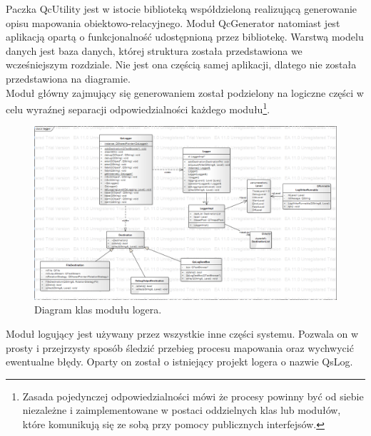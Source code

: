 \documentclass[12pt]{report}
\begin{document}
Paczka QcUtility jest w istocie biblioteką współdzieloną realizującą generowanie opisu mapowania obiektowo-relacyjnego. Moduł QcGenerator natomiast jest aplikacją opartą o funkcjonalność udostępnioną przez bibliotekę. Warstwą modelu danych jest baza danych, której struktura została przedstawiona we wcześniejszym rozdziale. Nie jest ona częścią samej aplikacji, dlatego nie została przedstawiona na diagramie. \\
	\indent Moduł główny zajmujący się generowaniem został podzielony na logiczne części w celu wyraźnej separacji odpowiedzialności każdego modułu\footnote{Zasada pojedynczej odpowiedzialności mówi że procesy powinny być od siebie niezależne i zaimplementowane w postaci oddzielnych klas lub modułów, które komunikują się ze sobą przy pomocy publicznych interfejsów.}.

\begin{figure}[h]
	\centering
	\includegraphics[width=1.6\textwidth, angle=90]{images/logger.png}
	\caption{Diagram klas modułu logera.}
\end{figure}
\FloatBarrier

Moduł logujący jest używany przez wszystkie inne części systemu. Pozwala on w prosty i przejrzysty sposób śledzić przebieg procesu mapowania oraz wychwycić ewentualne błędy. Oparty on został o istniejący projekt logera o nazwie QsLog. 
\end{document}
